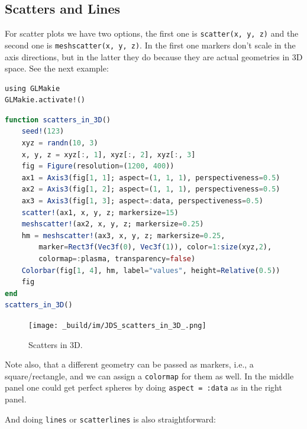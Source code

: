 \documentclass[
  notoc %
]{tufte-book}
\newcommand{\passthrough}[1]{#1}
\begin{document}
\hypertarget{scatters-and-lines}{%
\subsection{Scatters and Lines}\label{scatters-and-lines}}

For scatter plots we have two options, the first one is
\passthrough{\lstinline!scatter(x, y, z)!} and the second one is
\passthrough{\lstinline!meshscatter(x, y, z)!}. In the first one markers
don't scale in the axis directions, but in the latter they do because
they are actual geometries in 3D space. See the next example:

\begin{lstlisting}
using GLMakie
GLMakie.activate!()
\end{lstlisting}

\begin{lstlisting}[language=Julia]
function scatters_in_3D()
    seed!(123)
    xyz = randn(10, 3)
    x, y, z = xyz[:, 1], xyz[:, 2], xyz[:, 3]
    fig = Figure(resolution=(1200, 400))
    ax1 = Axis3(fig[1, 1]; aspect=(1, 1, 1), perspectiveness=0.5)
    ax2 = Axis3(fig[1, 2]; aspect=(1, 1, 1), perspectiveness=0.5)
    ax3 = Axis3(fig[1, 3]; aspect=:data, perspectiveness=0.5)
    scatter!(ax1, x, y, z; markersize=15)
    meshscatter!(ax2, x, y, z; markersize=0.25)
    hm = meshscatter!(ax3, x, y, z; markersize=0.25,
        marker=Rect3f(Vec3f(0), Vec3f(1)), color=1:size(xyz,2),
        colormap=:plasma, transparency=false)
    Colorbar(fig[1, 4], hm, label="values", height=Relative(0.5))
    fig
end
scatters_in_3D()
\end{lstlisting}

\begin{figure}
\hypertarget{fig:scatters_in_3D}{%
\centering
\texttt{[image: \_build/im/JDS\_scatters\_in\_3D\_.png]}
\caption{Scatters in 3D.}\label{fig:scatters_in_3D}
}
\end{figure}

Note also, that a different geometry can be passed as markers, i.e., a
square/rectangle, and we can assign a \passthrough{\lstinline!colormap!}
for them as well. In the middle panel one could get perfect spheres by
doing \passthrough{\lstinline!aspect = :data!} as in the right panel.

And doing \passthrough{\lstinline!lines!} or
\passthrough{\lstinline!scatterlines!} is also straightforward:
\end{document}
